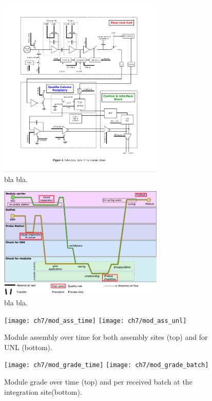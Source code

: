 \begin{figure}[!h]
  \centering
  \includegraphics[width=0.7\textwidth]{../images/ch7/pix_unit_cell}
  \caption[bla for index.]{bla bla.}\label{fig:pix_unit_cell}
\end{figure}


\begin{figure}[!h]
  \centering
  \includegraphics[width=0.7\textwidth]{../images/ch7/unl_workflow2}
  \caption[bla for index.]{bla bla.}\label{fig:unl_workflow2}
\end{figure}

\begin{figure}[ht]
\centering
  \texttt{[image: ch7/mod\_ass\_time]}
  \texttt{[image: ch7/mod\_ass\_unl]}
 \caption[Module assembly over time.]{Module assembly over time for both assembly sites (top) and for UNL (bottom).}\label{fig:mod_ass_time}
\end{figure}

\begin{figure}[h]
\begin{center}
  \texttt{[image: ch7/mod\_grade\_time]}
  \texttt{[image: ch7/mod\_grade\_batch]}
  \caption[Module grade over time.]{Module grade over time (top) and per received batch at the integration site(bottom).}\label{fig:mod_grad_time}
\end{center}
\end{figure}





